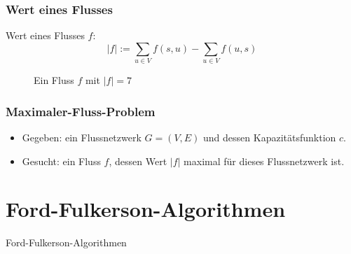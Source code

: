 \documentclass{beamer}
\newcommand{\ff}{Ford-Fulkerson}
\begin{document}
\begin{frame}
\frametitle{Wert eines Flusses}
Wert eines Flusses $f$:
\begin{equation*}
\lvert f \rvert := \sum_{u\in V} f(s,u) - \sum_{u\in V} f(u,s)
\end{equation*}
\pause
\begin{figure}
\begin{adjustbox}{width=0.8\textwidth}
\end{adjustbox}
\caption{Ein Fluss $f$ mit $\lvert f\rvert = 7$}
\end{figure}
\end{frame}

\begin{frame}
\frametitle{Maximaler-Fluss-Problem}
\begin{itemize}
\item<1-> Gegeben: ein Flussnetzwerk $G = (V,E)$ und dessen Kapazitätsfunktion $c$.
\vfill
\item<2-> Gesucht: ein Fluss $f$, dessen Wert $\lvert f \rvert$ maximal für dieses Flussnetzwerk ist.
\end{itemize}
\end{frame}

\section{\ff -Algorithmen}
\begin{frame}[plain]
\begin{center}
\begin{LARGE}
\ff -Algorithmen
\end{LARGE}
\end{center}
\end{frame}
\end{document}
